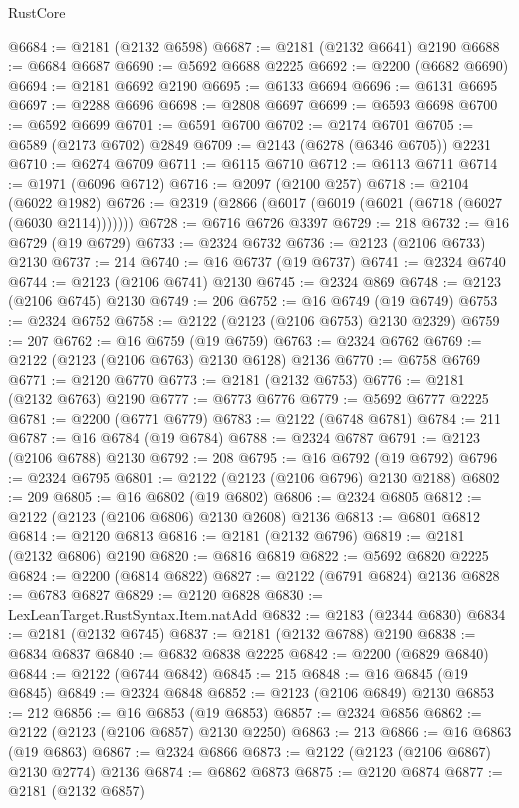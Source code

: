 \begin{lexlean}{RustCore}
\begin{coremodule}
@6684 := @2181 (@2132 @6598)
@6687 := @2181 (@2132 @6641) @2190
@6688 := @6684 @6687
@6690 := @5692 @6688 @2225
@6692 := @2200 (@6682 @6690)
@6694 := @2181 @6692 @2190
@6695 := @6133 @6694
@6696 := @6131 @6695
@6697 := @2288 @6696
@6698 := @2808 @6697
@6699 := @6593 @6698
@6700 := @6592 @6699
@6701 := @6591 @6700
@6702 := @2174 @6701
@6705 := @6589 (@2173 @6702) @2849
@6709 := @2143 (@6278 (@6346 @6705)) @2231
@6710 := @6274 @6709
@6711 := @6115 @6710
@6712 := @6113 @6711
@6714 := @1971 (@6096 @6712)
@6716 := @2097 (@2100 @257)
@6718 := @2104 (@6022 @1982)
@6726 := @2319 (@2866 (@6017 (@6019 (@6021 (@6718 (@6027 (@6030 @2114)))))))
@6728 := @6716 @6726 @3397
@6729 := 218
@6732 := @16 @6729 (@19 @6729)
@6733 := @2324 @6732
@6736 := @2123 (@2106 @6733) @2130
@6737 := 214
@6740 := @16 @6737 (@19 @6737)
@6741 := @2324 @6740
@6744 := @2123 (@2106 @6741) @2130
@6745 := @2324 @869
@6748 := @2123 (@2106 @6745) @2130
@6749 := 206
@6752 := @16 @6749 (@19 @6749)
@6753 := @2324 @6752
@6758 := @2122 (@2123 (@2106 @6753) @2130 @2329)
@6759 := 207
@6762 := @16 @6759 (@19 @6759)
@6763 := @2324 @6762
@6769 := @2122 (@2123 (@2106 @6763) @2130 @6128) @2136
@6770 := @6758 @6769
@6771 := @2120 @6770
@6773 := @2181 (@2132 @6753)
@6776 := @2181 (@2132 @6763) @2190
@6777 := @6773 @6776
@6779 := @5692 @6777 @2225
@6781 := @2200 (@6771 @6779)
@6783 := @2122 (@6748 @6781)
@6784 := 211
@6787 := @16 @6784 (@19 @6784)
@6788 := @2324 @6787
@6791 := @2123 (@2106 @6788) @2130
@6792 := 208
@6795 := @16 @6792 (@19 @6792)
@6796 := @2324 @6795
@6801 := @2122 (@2123 (@2106 @6796) @2130 @2188)
@6802 := 209
@6805 := @16 @6802 (@19 @6802)
@6806 := @2324 @6805
@6812 := @2122 (@2123 (@2106 @6806) @2130 @2608) @2136
@6813 := @6801 @6812
@6814 := @2120 @6813
@6816 := @2181 (@2132 @6796)
@6819 := @2181 (@2132 @6806) @2190
@6820 := @6816 @6819
@6822 := @5692 @6820 @2225
@6824 := @2200 (@6814 @6822)
@6827 := @2122 (@6791 @6824) @2136
@6828 := @6783 @6827
@6829 := @2120 @6828
@6830 := LexLeanTarget.RustSyntax.Item.natAdd
@6832 := @2183 (@2344 @6830)
@6834 := @2181 (@2132 @6745)
@6837 := @2181 (@2132 @6788) @2190
@6838 := @6834 @6837
@6840 := @6832 @6838 @2225
@6842 := @2200 (@6829 @6840)
@6844 := @2122 (@6744 @6842)
@6845 := 215
@6848 := @16 @6845 (@19 @6845)
@6849 := @2324 @6848
@6852 := @2123 (@2106 @6849) @2130
@6853 := 212
@6856 := @16 @6853 (@19 @6853)
@6857 := @2324 @6856
@6862 := @2122 (@2123 (@2106 @6857) @2130 @2250)
@6863 := 213
@6866 := @16 @6863 (@19 @6863)
@6867 := @2324 @6866
@6873 := @2122 (@2123 (@2106 @6867) @2130 @2774) @2136
@6874 := @6862 @6873
@6875 := @2120 @6874
@6877 := @2181 (@2132 @6857)

\end{coremodule}
\end{lexlean}

